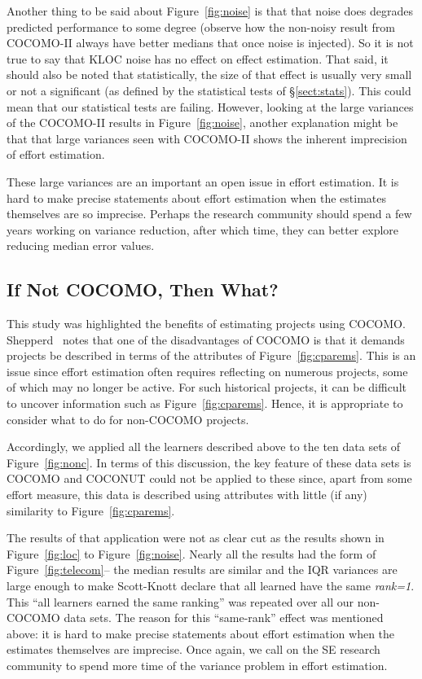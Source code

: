 \documentclass{sig-alternate}
\newcommand{\tion}[1]{\S\ref{sect:#1}}
\newcommand{\fig}[1]{Figure~\ref{fig:#1}}
\begin{document}
Another thing to be said about \fig{noise} is that that noise does
degrades predicted
performance to some degree (observe how the non-noisy result from COCOMO-II always
have better medians that once noise is injected). So it is not true to
say that KLOC noise has no effect on effect estimation.
That said, it should also be noted
that statistically, the size of that effect   is usually very small  or not
a significant (as defined by the statistical tests of \tion{stats}).
This could mean that our statistical tests are failing. However, looking at the large variances
of the COCOMO-II results in \fig{noise}, another explanation might be that
that large variances seen with COCOMO-II shows the inherent imprecision of effort
estimation. 

These large variances are an important an open issue in effort estimation.
It is hard to make precise statements about effort estimation when the estimates themselves
are so imprecise. Perhaps the research community should spend a few years  working
on variance reduction, after which time, they can better explore reducing median error values.
 
 
\subsection{If Not COCOMO, Then What?}\label{sect:nonc}

This study was highlighted the benefits of estimating projects using COCOMO.
Shepperd~\cite{shepperd07} notes that one of the disadvantages of COCOMO is that it demands projects be described
in terms of the attributes of \fig{cparems}. This is an issue since effort estimation often requires reflecting on
numerous projects, some of which may no longer be active. For such historical projects,
it can be difficult to uncover information such as \fig{cparems}. Hence,
it is appropriate to consider what to do for non-COCOMO projects.

Accordingly, we applied all the learners described above to the ten data sets of \fig{nonc}.
In terms of this discussion, the key feature of these data sets is   COCOMO and COCONUT could not be 
applied to these since, apart from some effort
measure, this data is described  using  attributes with little (if any)  similarity to \fig{cparems}. 

The results of that application were not as clear cut as the results shown in
\fig{loc} to \fig{noise}.  
Nearly all the results had the form of \fig{telecom}--  the median results
are similar and the IQR variances are large enough to make   Scott-Knott  
  declare that  all learned have the same {\em rank=1}. This ``all learners earned
the same ranking'' was repeated over all our non-COCOMO data sets. The reason for this
``same-rank'' effect was mentioned above: it is 
hard to make precise statements about effort estimation when the estimates themselves
are   imprecise. Once again, we call on the SE research community to spend more time
of the variance problem in effort estimation.
\end{document}
